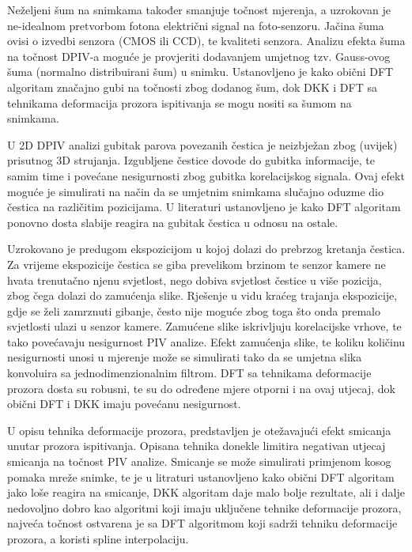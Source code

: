\begin{description}[style=unboxed,leftmargin=0cm]
	\item[Šum foto-senzora] Neželjeni šum na snimkama također smanjuje točnost mjerenja, a uzrokovan je ne-idealnom pretvorbom fotona električni signal na foto-senzoru. Jačina šuma ovisi o izvedbi senzora (CMOS ili CCD), te kvaliteti senzora. Analizu efekta šuma na točnost DPIV-a moguće je provjeriti dodavanjem umjetnog tzv. Gauss-ovog šuma (normalno distribuirani šum) u snimku. Ustanovljeno je kako obični DFT algoritam značajno gubi na točnosti zbog dodanog šum, dok DKK i DFT sa tehnikama deformacija prozora ispitivanja se mogu nositi sa šumom na snimkama.
	\item[Gubitak čestica unutar volumena ispitivanja (\textit{eng. out-of-plane motion})] U 2D DPIV analizi gubitak parova povezanih čestica je neizbježan zbog (uvijek) prisutnog 3D strujanja. Izgubljene čestice dovode do gubitka informacije, te samim time i povećane nesigurnosti zbog gubitka korelacijskog signala. Ovaj efekt moguće je simulirati na način da se umjetnim snimkama slučajno oduzme dio čestica na različitim pozicijama. U literaturi \cite{thielicke2014_phd} ustanovljeno je kako DFT algoritam ponovno dosta slabije reagira na gubitak čestica u odnosu na ostale.
	\item[Zamućenje pokreta] Uzrokovano je predugom ekspozicijom u kojoj dolazi do prebrzog kretanja čestica. Za vrijeme ekspozicije čestica se giba prevelikom brzinom te senzor kamere ne hvata trenutačno  njenu svjetlost, nego dobiva svjetlost čestice u više pozicija, zbog čega dolazi do zamućenja slike. Rješenje u vidu kraćeg trajanja ekspozicije, gdje se želi zamrznuti gibanje, često nije moguće zbog toga što onda premalo svjetlosti ulazi u senzor kamere. Zamućene slike iskrivljuju korelacijske vrhove, te tako povećavaju nesigurnost PIV analize. Efekt zamućenja slike, te koliku količinu nesigurnosti unosi u mjerenje može se simulirati tako da se umjetna slika konvoluira sa jednodimenzionalnim filtrom. DFT sa tehnikama deformacije prozora dosta su robusni, te su do određene mjere otporni i na ovaj utjecaj, dok obični DFT i DKK imaju povećanu nesigurnost.
	\item[Smicanje] U opisu tehnika deformacije prozora, predstavljen je otežavajući efekt smicanja unutar prozora ispitivanja. Opisana tehnika donekle limitira negativan utjecaj smicanja na točnost PIV analize. Smicanje se može simulirati primjenom kosog pomaka mreže snimke, te je u litraturi \cite{thielicke2014_phd} ustanovljeno kako obični DFT algoritam jako loše reagira na smicanje, DKK algoritam daje malo bolje rezultate, ali i dalje nedovoljno dobro kao algoritmi koji imaju uključene tehnike deformacije prozora, najveća točnost ostvarena je sa DFT algoritmom koji sadrži tehniku deformacije prozora, a koristi spline interpolaciju. 
\end{description}